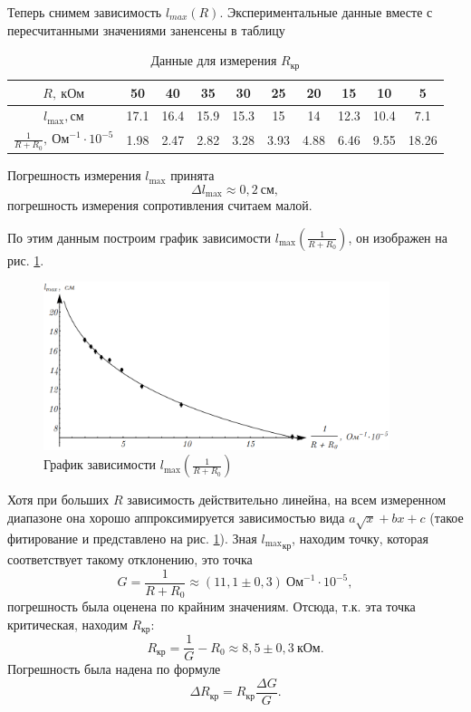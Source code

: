 \documentclass[12pt,a4paper]{article}
\begin{document}
Теперь снимем зависимость $l_{max}(R)$. Экспериментальные данные вместе с пересчитанными значениями заненсены в таблицу 
\begin{table}[ht]\centering
\begin{tabular}{|*{10}{c|}}
\hline
$R,~\text{кОм}$&50&40&35&30&25&20&15&10&5\\
\hline
$l_\text{max},\text{см}$&17.1&16.4&15.9&15.3&15&14&12.3&10.4&7.1\\
\hline
$\frac{1}{R + R_0},~\text{Ом}^{-1}\cdot10^{-5}$&1.98&2.47&2.82&3.28&3.93&4.88&6.46&9.55&18.26\\
\hline
\end{tabular}
\caption{Данные для измерения $R_\text{кр}$ \label{tab3}}
\end{table}

\noindent Погрешность измерения $l_\text{max}$ принята 
\begin{equation}
\Delta l_\text{max} \approx 0,2~\text{см},
\end{equation}
погрешность измерения сопротивления считаем малой.

По этим данным построим график зависимости $l_\text{max}\left(\frac{1}{R+R_0}\right)$, он изображен на рис. \ref{Fig6}.
\begin{figure}[ht]\centering
\includegraphics[width = 0.9\textwidth]{Plot3}
\captionsetup{justification = centering}
\caption{График зависимости $l_\text{max}\left(\frac{1}{R+R_0}\right)$\label{Fig6}} 
\end{figure}

Хотя при больших $R$ зависимость действительно линейна, на всем измеренном диапазоне она хорошо аппроксимируется зависимостью вида $a\sqrt{x} + bx + c$ (такое фитирование и представлено на рис. \ref{Fig6}). Зная ${l_\text{max}}_\text{кр}$, находим точку, которая соответствует такому отклонению, это точка
\begin{equation}
G = \frac{1}{R + R_0} \approx (11,1\pm0,3)~\text{Ом}^{-1}\cdot10^{-5},
\end{equation}
погрешность была оценена по крайним значениям. Отсюда, т.к. эта точка критическая, находим $R_\text{кр}$:
\begin{equation}
R_\text{кр} = \frac{1}{G} - R_0 \approx 8,5 \pm 0,3~\text{кОм}.
\end{equation}
Погрешность была надена по формуле
\begin{equation}
\Delta R_\text{кр} = R_\text{кр}\frac{\Delta G}{G}.
\end{equation}
\end{document}
